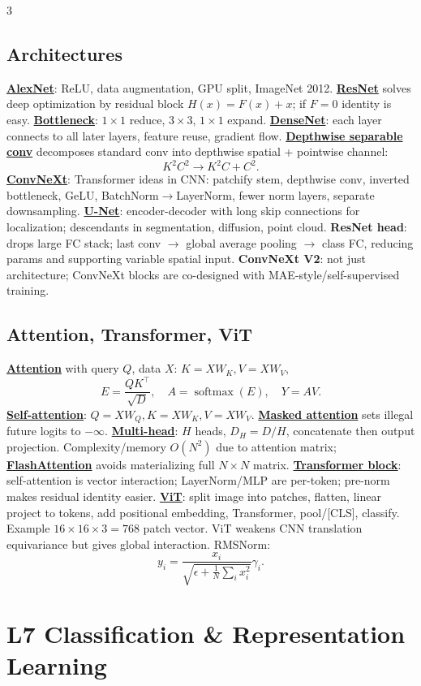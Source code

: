 \documentclass{article}
\numberwithin{equation}{subsection}
\newcommand{\key}[1]{\textbf{#1}}
\newcommand{\lowterm}[1]{\textbf{\underline{#1}}}
\DeclareMathOperator{\softmax}{softmax}
\begin{document}
\begin{multicols*}{3}
\subsection{Architectures}
\lowterm{AlexNet}: ReLU, data augmentation, GPU split, ImageNet 2012. \lowterm{ResNet} solves deep optimization by residual block $H(x)=F(x)+x$; if $F=0$ identity is easy. \lowterm{Bottleneck}: $1\times1$ reduce, $3\times3$, $1\times1$ expand. \lowterm{DenseNet}: each layer connects to all later layers, feature reuse, gradient flow. \lowterm{Depthwise separable conv} decomposes standard conv into depthwise spatial + pointwise channel:
\[
K^2C^2\to K^2C+C^2.
\]
\lowterm{ConvNeXt}: Transformer ideas in CNN: patchify stem, depthwise conv, inverted bottleneck, GeLU, BatchNorm$\to$LayerNorm, fewer norm layers, separate downsampling. \lowterm{U-Net}: encoder-decoder with long skip connections for localization; descendants in segmentation, diffusion, point cloud. \key{ResNet head}: drops large FC stack; last conv $\to$ global average pooling $\to$ class FC, reducing params and supporting variable spatial input. \key{ConvNeXt V2}: not just architecture; ConvNeXt blocks are co-designed with MAE-style/self-supervised training.

\subsection{Attention, Transformer, ViT}
\lowterm{Attention} with query $Q$, data $X$: $K=XW_K,V=XW_V$,
\[
E=\frac{QK^\top}{\sqrt{D}},\quad A=\softmax(E),\quad Y=AV.
\]
\lowterm{Self-attention}: $Q=XW_Q,K=XW_K,V=XW_V$. \lowterm{Masked attention} sets illegal future logits to $-\infty$. \lowterm{Multi-head}: $H$ heads, $D_H=D/H$, concatenate then output projection. Complexity/memory $O(N^2)$ due to attention matrix; \lowterm{FlashAttention} avoids materializing full $N\times N$ matrix.
\lowterm{Transformer block}: self-attention is vector interaction; LayerNorm/MLP are per-token; pre-norm makes residual identity easier. \lowterm{ViT}: split image into patches, flatten, linear project to tokens, add positional embedding, Transformer, pool/[CLS], classify. Example $16\times16\times3=768$ patch vector. ViT weakens CNN translation equivariance but gives global interaction.
RMSNorm:
\[
y_i=\frac{x_i}{\sqrt{\epsilon+\frac1N\sum_i x_i^2}}\gamma_i.
\]

\section{L7 Classification \& Representation Learning}

\end{multicols*}
\end{document}
